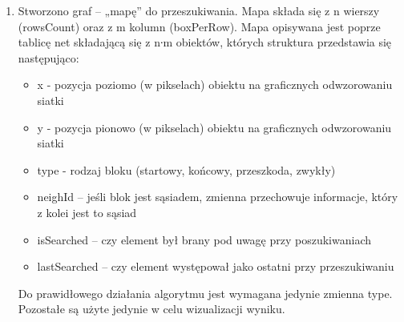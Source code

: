 \documentclass{article}
\begin{document}
\begin{enumerate}
	\item Stworzono graf – „mapę” do przeszukiwania. Mapa składa się z n wierszy (rowsCount) oraz z m kolumn (boxPerRow). Mapa opisywana jest poprze tablicę net składającą się z n∙m obiektów, których struktura przedstawia się następująco: 
	\begin{itemize}

		\item x    - pozycja poziomo (w pikselach) obiektu na graficznych odwzorowaniu siatki
		\item y   - pozycja pionowo (w pikselach) obiektu na graficznych odwzorowaniu siatki
		\item type  - rodzaj bloku (startowy, końcowy, przeszkoda, zwykły)
		\item neighId – jeśli blok jest sąsiadem, zmienna przechowuje informacje, który z kolei jest to sąsiad
		\item isSearched – czy element był brany pod uwagę przy poszukiwaniach
		\item lastSearched – czy element występował jako ostatni przy przeszukiwaniu
	\end{itemize}
	Do prawidłowego działania algorytmu jest wymagana jedynie zmienna type.  Pozostałe są użyte jedynie w celu wizualizacji wyniku. 
	

\end{enumerate}
\end{document}
